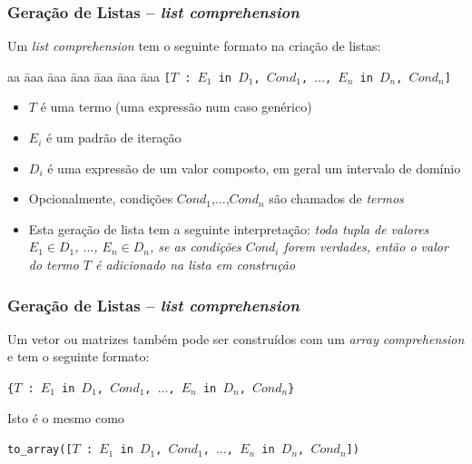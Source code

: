 \begin{frame}[fragile]

\frametitle{Geração de  Listas -- \textit{list comprehension}}

Um \textit{list comprehension} tem o seguinte formato
na criação de listas:
\begin{tabbing}
aa \= aaa \= aaa \= aaa \= aaa \= aaa \= aaa \kill
\> \> \texttt{[$T$ : $E_1$ \texttt{in} $D_1$, $Cond_1$, $\ldots$, $E_n$ in $D_n$, $Cond_n$]} 
\end{tabbing}
\begin{itemize}
  \item $T$ é uma termo (uma expressão num caso genérico)
  \item $E_i$ é um padrão de iteração 
  \item $D_i$ é uma expressão de um valor composto, em geral um intervalo de domínio
  \item Opcionalmente,  condições $Cond_1$,$\ldots$,$Cond_n$  são chamados de \textit{termos}
  \item Esta geração de lista tem a seguinte interpretação: 
  \textit{toda tupla de valores $E_1 \in D_1$, $\ldots$, $E_n \in D_n$, 
  se as condições $Cond_i$ forem verdades, então o valor do termo $T$ 
  é adicionado na lista em construção}
\end{itemize}
\end{frame}


\begin{frame}[fragile]

\frametitle{Geração de  Listas -- \textit{list comprehension}}

Um vetor ou matrizes também pode 
ser construídos com um  \textit{array comprehension} e tem
o seguinte formato:
\begin{center}
\texttt{\{$T$ : $E_1$ \texttt{in} $D_1$, $Cond_1$, $\ldots$, $E_n$ in $D_n$, $Cond_n$\}} 
\end{center}

\pause
Isto é o mesmo como
\begin{center}
\texttt{to\_array([$T$ : $E_1$ \texttt{in} $D_1$, $Cond_1$, $\ldots$, $E_n$ in $D_n$, $Cond_n$])} 

\end{center}
\end{frame}


